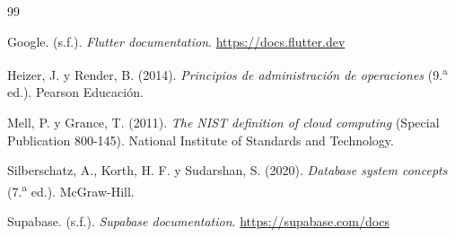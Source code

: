 \documentclass[12pt,a4paper]{article}
\begin{document}
\begin{thebibliography}{99}

Google. (s.f.).
\newblock \emph{Flutter documentation}.
\newblock \url{https://docs.flutter.dev}

Heizer, J. y Render, B. (2014).
\newblock \emph{Principios de administraci\'on de operaciones} (9.\textsuperscript{a} ed.).
\newblock Pearson Educaci\'on.

Mell, P. y Grance, T. (2011).
\newblock \emph{The NIST definition of cloud computing} (Special Publication 800-145).
\newblock National Institute of Standards and Technology.

Silberschatz, A., Korth, H. F. y Sudarshan, S. (2020).
\newblock \emph{Database system concepts} (7.\textsuperscript{a} ed.).
\newblock McGraw-Hill.

Supabase. (s.f.).
\newblock \emph{Supabase documentation}.
\newblock \url{https://supabase.com/docs}

\end{thebibliography}
\end{document}
